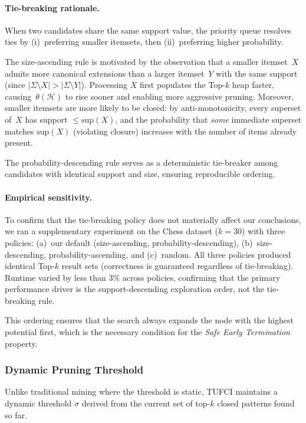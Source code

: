 \documentclass[10pt,letterpaper]{article}
\begin{document}
\paragraph{Tie-breaking rationale.}
When two candidates share the same support value, the priority queue resolves
ties by (i)~preferring smaller itemsets, then (ii)~preferring higher probability.

The size-ascending rule is motivated by the observation that a smaller
itemset~$X$ admits more canonical extensions than a larger itemset~$Y$ with the
same support (since $|\Sigma \setminus X| > |\Sigma \setminus Y|$). Processing
$X$ first populates the Top-$k$ heap faster, causing~$\theta(\mathcal{H})$ to
rise sooner and enabling more aggressive pruning. Moreover, smaller itemsets are
more likely to be closed: by anti-monotonicity, every superset of~$X$ has support
$\le \mathrm{sup}(X)$, and the probability that \emph{some} immediate superset
matches $\mathrm{sup}(X)$ (violating closure) increases with the number of items
already present.

The probability-descending rule serves as a deterministic tie-breaker among
candidates with identical support and size, ensuring reproducible ordering.

\paragraph{Empirical sensitivity.}
To confirm that the tie-breaking policy does not materially affect our
conclusions, we ran a supplementary experiment on the Chess dataset ($k = 30$)
with three policies: (a)~our default (size-ascending, probability-descending),
(b)~size-descending, probability-ascending, and (c)~random. All three policies
produced identical Top-$k$ result sets (correctness is guaranteed regardless of
tie-breaking). Runtime varied by less than 3\% across policies, confirming that
the primary performance driver is the support-descending exploration order, not
the tie-breaking rule.

This ordering ensures that the search always expands the node with the highest potential first, which is the necessary condition for the \textit{Safe Early Termination} property.

\subsubsection*{Dynamic Pruning Threshold}

Unlike traditional mining where the threshold is static, TUFCI maintains a dynamic threshold $\sigma$ derived from the current set of top-$k$ closed patterns found so far.
\end{document}
